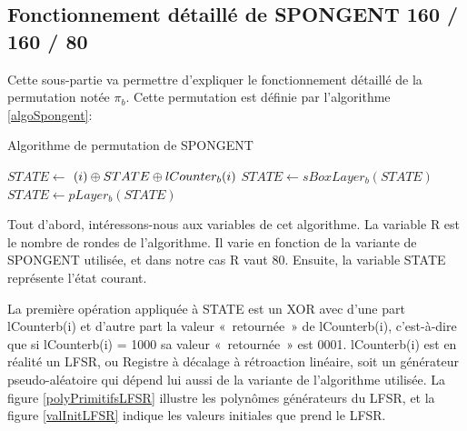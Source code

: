 		\subsection{Fonctionnement détaillé de SPONGENT 160 / 160 / 80}
		Cette sous-partie va permettre d’expliquer le fonctionnement détaillé de la permutation notée $\pi_{b}$.
		Cette permutation est définie par l’algorithme \ref{algoSpongent}:
		\begin{algorithm}
			\caption{Algorithme de permutation de SPONGENT}
			\label{algoSpongent}
			\begin{algorithmic}
					\STATE $ STATE \leftarrow $ $(i) \mathbin{\oplus} STATE \mathbin{\oplus} lCounter_{b}(i)$
					\STATE $ STATE \leftarrow sBoxLayer_{b}(STATE)$
					\STATE $ STATE \leftarrow pLayer_{b}(STATE)$
				\ENDFOR
			\end{algorithmic}
		\end{algorithm}

		Tout d’abord, intéressons-nous aux variables de cet algorithme.
		La variable R est le nombre de rondes de l’algorithme. Il varie en fonction de la variante de SPONGENT utilisée, et dans notre cas R vaut 80.
		Ensuite, la variable STATE représente l’état courant.

		La première opération appliquée à STATE est un XOR avec d’une part lCounterb(i) et d’autre part la valeur « retournée » de lCounterb(i),
		c’est-à-dire que si lCounterb(i) = 1000 sa valeur « retournée » est 0001. lCounterb(i) est en réalité un LFSR, ou Registre à décalage à rétroaction linéaire,
		soit un générateur pseudo-aléatoire qui dépend lui aussi de la variante de l’algorithme utilisée.
		La figure \ref{polyPrimitifsLFSR} illustre les polynômes générateurs du LFSR, et la figure \ref{valInitLFSR} indique les valeurs initiales que prend le LFSR.

